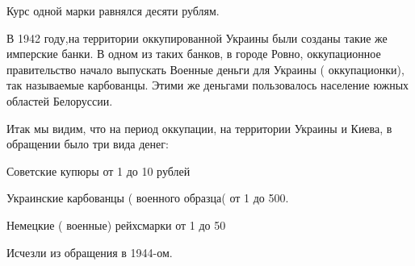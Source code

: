 
Курс одной марки равнялся десяти рублям.

В 1942 году,на территории оккупированной Украины были созданы такие же
имперские банки. В одном из таких банков, в городе Ровно, оккупационное
правительство начало выпускать Военные деньги для Украины ( оккупационки), так
называемые карбованцы. Этими же деньгами пользовалось население южных областей
Белоруссии.


Итак мы видим, что на период оккупации, на территории Украины и Киева, в
обращении было три вида денег:

Советские купюры от 1 до 10 рублей

Украинские карбованцы ( военного образца( от 1 до 500.

Немецкие ( военные) рейхсмарки от 1 до 50 

Исчезли из обращения в 1944-ом.
